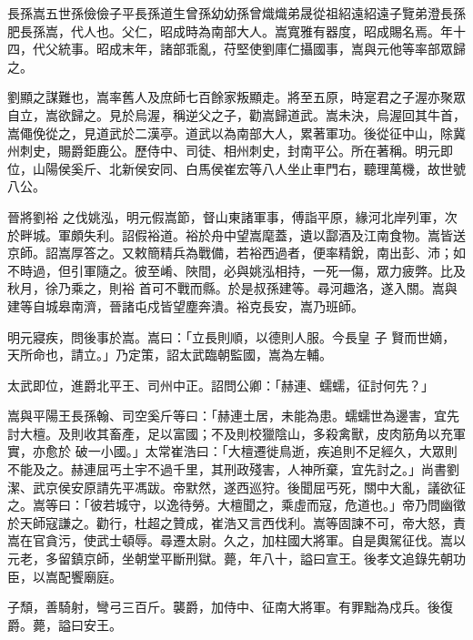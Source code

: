 
\begin{pinyinscope}

 長孫嵩五世孫儉儉子平長孫道生曾孫幼幼孫曾熾熾弟晟從祖紹遠紹遠子覽弟澄長孫肥長孫嵩，代人也。父仁，昭成時為南部大人。嵩寬雅有器度，昭成賜名焉。年十
 四，代父統事。昭成末年，諸部乖亂，苻堅使劉庫仁攝國事，嵩與元他等率部眾歸之。



 劉顯之謀難也，嵩率舊人及庶師七百餘家叛顯走。將至五原，時寔君之子渥亦聚眾自立，嵩欲歸之。見於烏渥，稱逆父之子，勸嵩歸道武。嵩未決，烏渥回其牛首，嵩僶俛從之，見道武於二漢亭。道武以為南部大人，累著軍功。後從征中山，除冀州刺史，賜爵鉅鹿公。歷侍中、司徒、相州刺史，封南平公。所在著稱。明元即位，山陽侯奚斤、北新侯安同、白馬侯崔宏等八人坐止車門右，聽理萬機，故世號八公。



 晉將劉裕
 之伐姚泓，明元假嵩節，督山東諸軍事，傅詣平原，緣河北岸列軍，次於畔城。軍頗失利。詔假裕道。裕於舟中望嵩麾蓋，遺以酃酒及江南食物。嵩皆送京師。詔嵩厚答之。又敕簡精兵為戰備，若裕西過者，便率精銳，南出彭、沛；如不時過，但引軍隨之。彼至崤、陜間，必與姚泓相持，一死一傷，眾力疲弊。比及秋月，徐乃乘之，則裕
 首可不戰而縣。於是叔孫建等。尋河趣洛，遂入關。嵩與建等自城皋南濟，晉諸屯戍皆望塵奔潰。裕克長安，嵩乃班師。



 明元寢疾，問後事於嵩。嵩曰：「立長則順，以德則人服。今長皇
 子
 賢而世嫡，天所命也，請立。」乃定策，詔太武臨朝監國，嵩為左輔。



 太武即位，進爵北平王、司州中正。詔問公卿：「赫連、蠕蠕，征討何先？」



 嵩與平陽王長孫翰、司空奚斤等曰：「赫連土居，未能為患。蠕蠕世為邊害，宜先討大檀。及則收其畜產，足以富國；不及則校獵陰山，多殺禽獸，皮肉筋角以充軍實，亦愈於
 破一小國。」太常崔浩曰：「大檀遷徙鳥逝，疾追則不足經久，大眾則不能及之。赫連屈丐土宇不過千里，其刑政殘害，人神所棄，宜先討之。」尚書劉潔、武京侯安原請先平馮跋。帝默然，遂西巡狩。後聞屈丐死，關中大亂，議欲征之。嵩等曰：「彼若城守，以逸待勞。大檀聞之，乘虛而寇，危道也。」帝乃問幽徵於天師寇謙之。勸行，杜超之贊成，崔浩又言西伐利。嵩等固諫不可，帝大怒，責嵩在官貪污，使武士頓辱。尋遷太尉。久之，加柱國大將軍。自是輿駕征伐。嵩以元老，多留鎮京師，坐朝堂平斷刑獄。薨，年八十，謚曰宣王。後孝文追錄先朝功臣，以嵩配饗廟庭。



 子頹，善騎射，彎弓三百斤。襲爵，加侍中、征南大將軍。有罪黜為戍兵。後復爵。薨，謚曰安王。




\end{pinyinscope}

